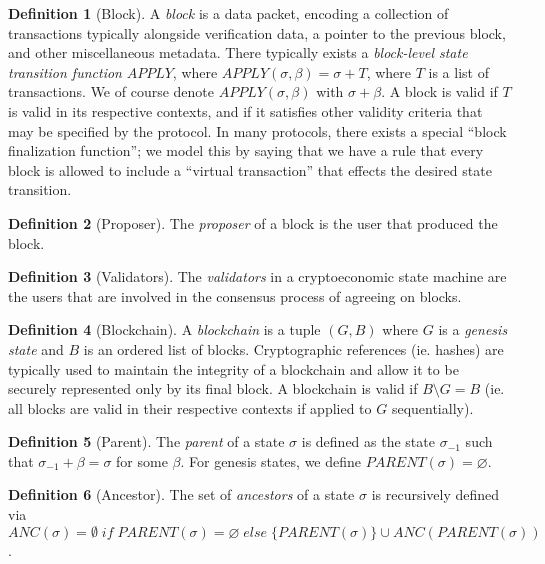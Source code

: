 \documentclass[11pt,a4paper]{report}
\theoremstyle{plain}
\theoremstyle{definition}
\newtheorem{defn}{Definition}[chapter]
\theoremstyle{remark}
\begin{document}
\begin{defn}[Block]
A \emph{block} is a data packet, encoding a collection of transactions typically alongside verification data, a pointer to the previous block, and other miscellaneous metadata. There typically exists a \emph{block-level state transition function} $APPLY$, where $APPLY(\sigma, \beta) = \sigma + T$, where $T$ is a list of transactions. We of course denote $APPLY(\sigma, \beta)$ with $\sigma + \beta$. A block is valid if $T$ is valid in its respective contexts, and if it satisfies other validity criteria that may be specified by the protocol. In many protocols, there exists a special ``block finalization function''; we model this by saying that we have a rule that every block is allowed to include a ``virtual transaction'' that effects the desired state transition.
\end{defn}

\begin{defn}[Proposer]
The \emph{proposer} of a block is the user that produced the block.
\end{defn}

\begin{defn}[Validators]
The \emph{validators} in a cryptoeconomic state machine are the users that are involved in the consensus process of agreeing on blocks.
\end{defn}

\begin{defn}[Blockchain]
A \emph{blockchain} is a tuple $(G, B)$ where $G$ is a \emph{genesis state} and $B$ is an ordered list of blocks. Cryptographic references (ie. hashes) are typically used to maintain the integrity of a blockchain and allow it to be securely represented only by its final block. A blockchain is valid if $B \setminus G = B$ (ie. all blocks are valid in their respective contexts if applied to $G$ sequentially).
\end{defn}

\begin{defn}[Parent]
The \emph{parent} of a state $\sigma$ is defined as the state $\sigma_{-1}$ such that $\sigma_{-1} + \beta = \sigma$ for some $\beta$. For genesis states, we define $PARENT(\sigma) = \varnothing$.
\end{defn}

\begin{defn}[Ancestor]
The set of \emph{ancestors} of a state $\sigma$ is recursively defined via $ANC(\sigma) = \emptyset \; if \; PARENT(\sigma) = \varnothing \; else \; \{PARENT(\sigma)\} \cup ANC(PARENT(\sigma))$.
\end{defn}
\end{document}
